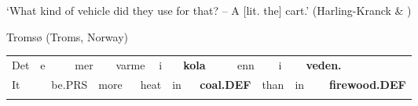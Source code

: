 \begin{styleTranslation}
‘What kind of vehicle did they use for that? – A [lit. the] cart.’ (Harling-Kranck \& \citet[42]{Mara1998})

\end{styleTranslation}

\begin{listWWNumileveli}
\item 

\begin{styleExample}
Tromsø (Troms, Norway)

\end{styleExample}

\end{listWWNumileveli}

\begin{listWWNumxviileveli}
\item 

\end{listWWNumxviileveli}

\begin{tabular}{llllllllllllllllll}
\lsptoprule
Det & \multicolumn{2}{l}{e

} & \multicolumn{2}{l}{mer

} & \multicolumn{2}{l}{varme

} & \multicolumn{2}{l}{i

} & \multicolumn{2}{l}{{\bfseries kola}

} & \multicolumn{2}{l}{enn

} & \multicolumn{2}{l}{i

} & \multicolumn{2}{l}{{\bfseries veden.}

} & \\
\multicolumn{2}{l}{It

} & \multicolumn{2}{l}{be.PRS

} & \multicolumn{2}{l}{more

} & \multicolumn{2}{l}{heat

} & \multicolumn{2}{l}{in

} & \multicolumn{2}{l}{{\bfseries coal.DEF}

} & \multicolumn{2}{l}{than

} & \multicolumn{2}{l}{in

} & \multicolumn{2}{l}{{\bfseries firewood.DEF}

}\\
\lspbottomrule
\end{tabular}

